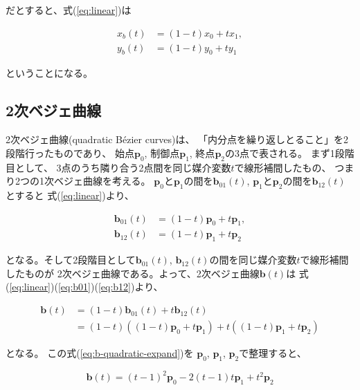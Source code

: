 \documentclass[dvipdfmx]{jsarticle}
\newcommand\VectBold[1]{\boldsymbol{#1}}
\newcommand\VectBold[1]{\symbf{#1}}
\newcommand\Vect[1]{\VectBold{#1}}
\begin{document}
だとすると、式(\ref{eq:linear})は

\begin{align}
  x_b\left(t\right)&=\left(1-t\right)x_0 + tx_1, \\
  y_b\left(t\right)&=\left(1-t\right)y_0 + ty_1
\end{align}

ということになる。

\subsection{2次ベジェ曲線}

2次ベジェ曲線(quadratic Bézier curves)は、
「内分点を繰り返しとること」を2段階行ったものであり、
始点$\Vect{p}_0$, 制御点$\Vect{p}_1$, 終点$\Vect{p}_2$の3点で表される。
まず1段階目として、
3点のうち隣り合う2点間を同じ媒介変数$t$で線形補間したもの、
つまり2つの1次ベジェ曲線を考える。
$\Vect{p}_0$と$\Vect{p}_1$の間を$\Vect{b}_{01}\left(t\right)$,
$\Vect{p}_1$と$\Vect{p}_2$の間を$\Vect{b}_{12}\left(t\right)$とすると
式(\ref{eq:linear})より、

\begin{align}
  \Vect{b}_{01}\left(t\right)&=\left(1-t\right)\Vect{p}_0 + t\Vect{p}_1,
  \label{eq:b01}
  \\
  \Vect{b}_{12}\left(t\right)&=\left(1-t\right)\Vect{p}_1 + t\Vect{p}_2
  \label{eq:b12}
\end{align}

となる。そして2段階目として$\Vect{b}_{01}\left(t\right)$,
$\Vect{b}_{12}\left(t\right)$の間を同じ媒介変数$t$で線形補間したものが
2次ベジェ曲線である。よって、2次ベジェ曲線$\Vect{b}\left(t\right)$は
式(\ref{eq:linear})(\ref{eq:b01})(\ref{eq:b12})より、

\begin{align}
  \Vect{b}\left(t\right)
  &=
  \left(1-t\right)\Vect{b}_{01}\left(t\right) + t\Vect{b}_{12}\left(t\right)
  \label{eq:b-quadratic}
  \\
  &=
  \left(1-t\right)\left(\left(1-t\right)\Vect{p}_0+t\Vect{p}_1\right)
  +
  t\left(\left(1-t\right)\Vect{p}_1+t\Vect{p}_2\right)
  \label{eq:b-quadratic-expand}
\end{align}

となる。
この式(\ref{eq:b-quadratic-expand})を
$\Vect{p}_0$, $\Vect{p}_1$, $\Vect{p}_2$で整理すると、

\begin{equation}
  \Vect{b}\left(t\right)
  = \left(t-1\right)^2 \Vect{p}_0
  - 2\left(t-1\right)t \Vect{p}_1
  + t^2 \Vect{p}_2
  \label{eq:quadratic}
\end{equation}
\end{document}
